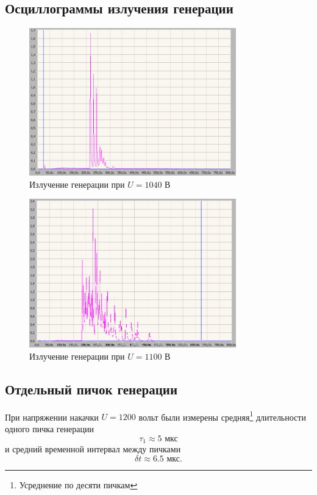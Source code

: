 \documentclass[a4paper,14pt]{extarticle}
\begin{document}
\subsection{Осциллограммы излучения генерации}
\begin{figure}[H]
  \centering
  \includegraphics[width=0.8\textwidth]{png/1040Binv.png}
  \caption{Излучение генерации при $U=1040$ В}
  \label{fig:figure1}
\end{figure}
\begin{figure}[H]
  \centering
  \includegraphics[width=0.8\textwidth]{png/1100Binv.png}
  \caption{Излучение генерации при $U=1100$ В}
  \label{fig:figure1}
\end{figure}

\subsection{Отдельный пичок генерации}

При напряжении накачки $U=1200$ вольт были измерены средняя\footnote{Усреднение по десяти пичкам} длительности одного пичка генерации
\begin{equation}
  \tau_1 \approx 5\text{ мкс}
\end{equation}
и средний временной интервал между пичками
\begin{equation}
  \delta t \approx 6.5\text{ мкс}.
\end{equation}
\end{document}
